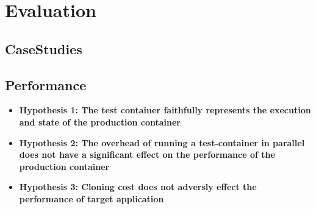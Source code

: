 \section{Evaluation}
\label{sec:evaluation}

\subsection{CaseStudies}
\label{sec:casestudy}

\subsection{Performance}
\label{sec:performance}

\begin{itemize}
  \item \textbf{Hypothesis 1: The test container faithfully represents the execution and state of the production container}

  \item \textbf{Hypothesis 2: The overhead of running a test-container in parallel does not have a significant effect on the performance of the production container}

  \item \textbf{Hypothesis 3: Cloning cost does not adversly effect the performance of target application} 
\end{itemize}
